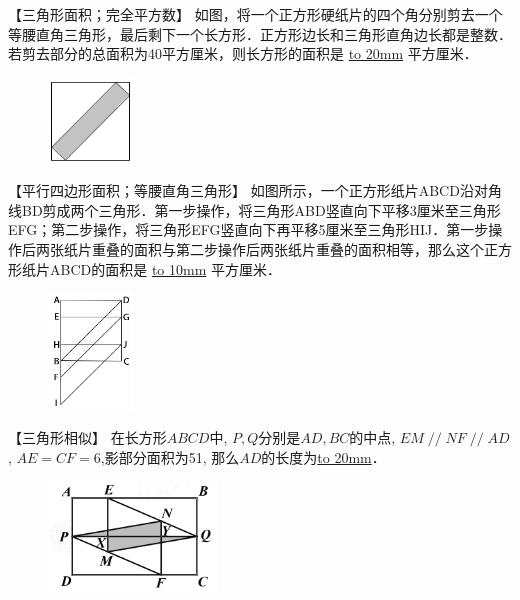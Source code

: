 \item {
    【三角形面积；完全平方数】
    {如图，将一个正方形硬纸片的四个角分别剪去一个等腰直角三角形，最后剩下一个长方形．正方形边长和三角形直角边长都是整数．若剪去部分的总面积为40平方厘米，则长方形的面积是 \underline{\hbox to 20mm{}} 平方厘米．} 
    \begin{figure}[H] 
        \centering
        \includegraphics[width=0.2\textwidth]{./pics/Chapter_3/12.png}
    \end{figure}
    \vspace{1cm}
}

\item {
    【平行四边形面积；等腰直角三角形】
    {如图所示，一个正方形纸片ABCD沿对角线BD剪成两个三角形．第一步操作，将三角形ABD竖直向下平移3厘米至三角形EFG；第二步操作，将三角形EFG竖直向下再平移5厘米至三角形HIJ．第一步操作后两张纸片重叠的面积与第二步操作后两张纸片重叠的面积相等，那么这个正方形纸片ABCD的面积是 \underline{\hbox to 10mm{}} 平方厘米．} 
    \begin{figure}[H] 
        \centering
        \includegraphics[width=0.2\textwidth]{./pics/Chapter_3/10.png}
    \end{figure}
    \vspace{1cm}
}

\item {
    【三角形相似】
    在长方形$ABCD$中, $P,Q$分别是$AD,BC$的中点, $EM\mathop{//}NF\mathop{//}AD$, $AE=CF=6$,影部分面积为51, 那么$AD$的长度为\underline{\hbox to 20mm{}}．
    \begin{figure}[H] 
        \centering
        \includegraphics[width=0.4\textwidth]{./pics/Chapter_3/1.png}
    \end{figure}
    \vspace{1cm}
}

